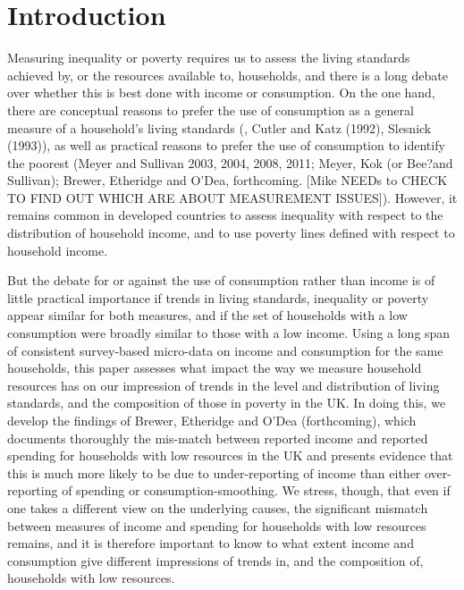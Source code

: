 
\section{Introduction} 



Measuring inequality or poverty requires us to assess the living standards achieved by, or the resources available to, households, and there is a long debate over whether this is best done with income or consumption. On the one hand, there are conceptual reasons to prefer the use of consumption as a general measure of a household's living standards (\cite{Poterba1989}, Cutler and Katz (1992), Slesnick (1993)), as well as practical reasons to prefer the use of consumption to identify the poorest (Meyer and Sullivan 2003, 2004, 2008, 2011; Meyer, Kok (or Bee?and Sullivan); Brewer, Etheridge and O'Dea, forthcoming. [Mike NEEDs to CHECK TO FIND OUT WHICH ARE ABOUT MEASUREMENT ISSUES]). However, it remains common in developed countries to assess inequality with respect to the distribution of household income, and to use poverty lines defined with respect to household income. 

But the debate for or against the use of consumption rather than income is of little practical importance if trends in living standards, inequality or poverty appear similar for both measures, and if the set of households with a low consumption were broadly similar to those with a low income. Using a long span of consistent survey-based micro-data on income and consumption for the same households, this paper assesses what impact the way we measure household resources has on our impression of trends in the level and distribution of living standards, and the composition of those in poverty in the UK. In doing this, we develop the findings of Brewer, Etheridge and O'Dea (forthcoming), which documents thoroughly the mis-match between reported income and reported spending for households with low resources in the UK and presents evidence that this is much more likely to be due to under-reporting of income than either over-reporting of spending or consumption-smoothing. We stress, though, that even if one takes a different view on the underlying causes, the significant mismatch between measures of income and spending for households with low resources remains, and it is therefore important to know to what extent income and consumption give different impressions of trends in, and the composition of, households with low resources. 

